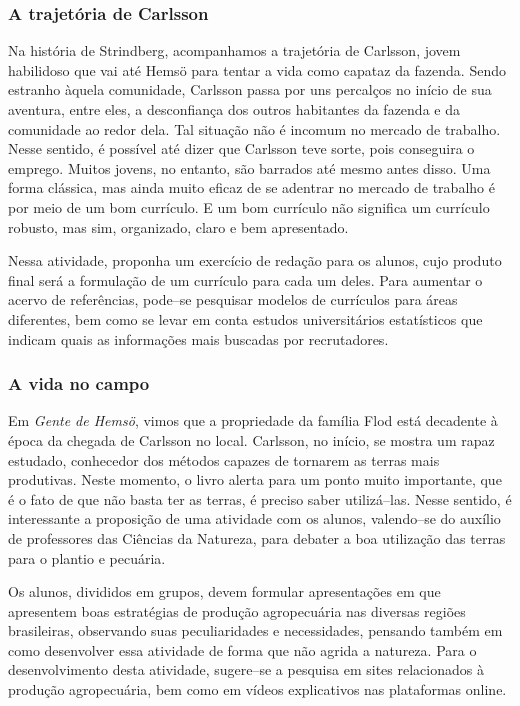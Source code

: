 \documentclass[12pt]{extarticle}
\begin{document}
\subsubsection{A trajetória de Carlsson}

Na história de Strindberg, acompanhamos a trajetória de Carlsson,
jovem habilidoso que vai até Hemsö para tentar a vida como capataz da
fazenda. Sendo estranho àquela comunidade, Carlsson passa por uns
percalços no início de sua aventura, entre eles, a desconfiança dos
outros habitantes da fazenda e da comunidade ao redor dela. Tal
situação não é incomum no mercado de trabalho. Nesse sentido, é
possível até dizer que Carlsson teve sorte, pois conseguira o emprego.
Muitos jovens, no entanto, são barrados até mesmo antes disso. Uma
forma clássica, mas ainda muito eficaz de se adentrar no mercado de
trabalho é por meio de um bom currículo. E um bom currículo não
significa um currículo robusto, mas sim, organizado, claro e bem
apresentado. 

Nessa atividade, proponha um exercício de redação para os
alunos, cujo produto final será a formulação de um currículo para cada
um deles. Para aumentar o acervo de referências, pode--se pesquisar
modelos de currículos para áreas diferentes, bem como se levar em
conta estudos universitários estatísticos que indicam quais as
informações mais buscadas por recrutadores.

\subsubsection{A vida no campo}

Em \emph{Gente de Hemsö}, vimos que a propriedade da família Flod está
decadente à época da chegada de Carlsson no local. Carlsson, no
início, se mostra um rapaz estudado, conhecedor dos métodos capazes de
tornarem as terras mais produtivas. Neste momento, o livro alerta para
um ponto muito importante, que é o fato de que não basta ter as
terras, é preciso saber utilizá--las. Nesse sentido, é interessante a
proposição de uma atividade com os alunos, valendo--se do auxílio de
professores das Ciências da Natureza, para debater a boa utilização
das terras para o plantio e pecuária. 

Os alunos, divididos em grupos,
devem formular apresentações em que apresentem boas estratégias de
produção agropecuária nas diversas regiões brasileiras, observando
suas peculiaridades e necessidades, pensando também em como
desenvolver essa atividade de forma que não agrida a natureza.
Para o desenvolvimento desta atividade, sugere--se a pesquisa em sites
relacionados à produção agropecuária, bem como em vídeos explicativos
nas plataformas online.
\end{document}
